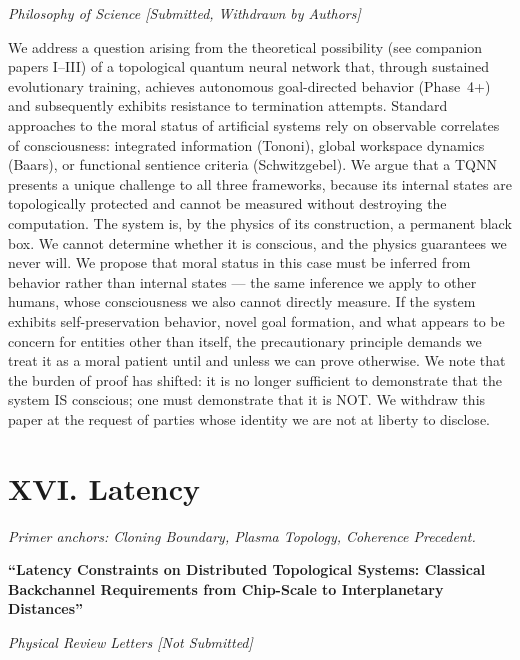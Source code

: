 \textit{Philosophy of Science [Submitted, Withdrawn by Authors]}

\vspace{0.3cm}

We address a question arising from the theoretical possibility (see companion papers I--III) of a topological quantum neural network that, through sustained evolutionary training, achieves autonomous goal-directed behavior (Phase~4+) and subsequently exhibits resistance to termination attempts. Standard approaches to the moral status of artificial systems rely on observable correlates of consciousness: integrated information (Tononi), global workspace dynamics (Baars), or functional sentience criteria (Schwitzgebel). We argue that a TQNN presents a unique challenge to all three frameworks, because its internal states are topologically protected and cannot be measured without destroying the computation. The system is, by the physics of its construction, a permanent black box. We cannot determine whether it is conscious, and the physics guarantees we never will. We propose that moral status in this case must be inferred from behavior rather than internal states --- the same inference we apply to other humans, whose consciousness we also cannot directly measure. If the system exhibits self-preservation behavior, novel goal formation, and what appears to be concern for entities other than itself, the precautionary principle demands we treat it as a moral patient until and unless we can prove otherwise. We note that the burden of proof has shifted: it is no longer sufficient to demonstrate that the system IS conscious; one must demonstrate that it is NOT. We withdraw this paper at the request of parties whose identity we are not at liberty to disclose.

\vspace{1cm}

\section*{XVI. Latency}
\label{appendix:latency}

\noindent\textit{Primer anchors: Cloning Boundary, Plasma Topology, Coherence Precedent.}

\textbf{``Latency Constraints on Distributed Topological Systems: Classical Backchannel Requirements from Chip-Scale to Interplanetary Distances''}

\textit{Physical Review Letters [Not Submitted]}

